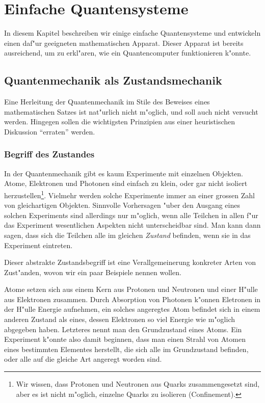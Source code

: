 \chapter{Einfache Quantensysteme\label{chapter:einfache-quantensysteme}}
\rhead{}
In diesem Kapitel beschreiben wir einige einfache Quantensysteme und
entwickeln einen daf"ur geeigneten mathematischen Apparat. Dieser
Apparat ist bereits ausreichend, um zu erkl"aren, wie ein Quantencomputer
funktionieren k"onnte.

\section{Quantenmechanik als Zustandsmechanik}
Eine Herleitung der Quantenmechanik im Stile des Beweises eines mathematischen
Satzes ist nat"ur\-lich nicht m"oglich, und soll auch nicht versucht werden.
Hingegen sollen die wichtigsten Prinzipien aus einer heuristischen
Diskussion ``erraten'' werden. 

\subsection{Begriff des Zustandes}
In der Quantenmechanik gibt es kaum Experimente mit einzelnen Objekten.
Atome, Elektronen und Photonen sind einfach zu klein, oder gar nicht
isoliert herzustellen\footnote{Wir wissen, dass Protonen und Neutronen aus
Quarks zusammengesetzt sind, aber es ist nicht m"oglich, einzelne Quarks
zu isolieren (Confinement).}.
Vielmehr werden solche Experimente immer
an einer grossen Zahl von gleichartigen Objekten.
Sinnvolle Vorhersagen "uber den Ausgang eines solchen Experiments
sind allerdings nur m"oglich, wenn alle
Teilchen in allen f"ur das Experiment wesentlichen Aspekten
nicht unterscheidbar sind. Man kann dann sagen, dass sich die
Teilchen alle im gleichen {\em Zustand}\/ befinden, wenn sie in
das Experiment eintreten.

Dieser abstrakte Zustandsbegriff ist eine Verallgemeinerung konkreter
Arten von Zust"anden, wovon wir ein paar Beispiele nennen wollen.

Atome setzen sich aus einem Kern aus Protonen und Neutronen und einer
H"ulle aus Elektronen zusammen.
Durch Absorption von Photonen k"onnen Eletronen in der H"ulle Energie
aufnehmen, ein solches angeregtes Atom befindet sich in einem anderen
Zustand als eines, dessen Elektronen so viel Energie wie m"oglich
abgegeben haben.
Letzteres nennt man den Grundzustand eines Atoms.
Ein Experiment k"onnte also damit beginnen,
dass man einen Strahl von Atomen eines bestimmten Elementes herstellt,
die sich alle im Grundzustand befinden, oder alle auf die gleiche Art
angeregt worden sind.

